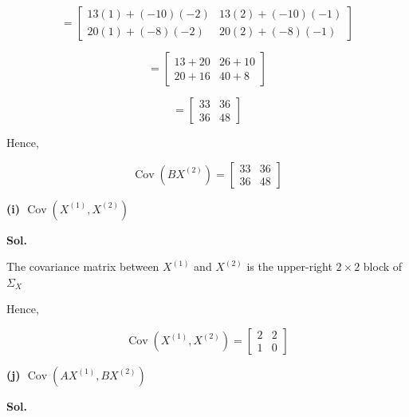 \documentclass[12pt]{article}
\begin{document}
\[
=
\begin{bmatrix}
13(1)+(-10)(-2) &
13(2)+(-10)(-1)
\\
20(1)+(-8)(-2) &
20(2)+(-8)(-1)
\end{bmatrix}
\]

\[
=
\begin{bmatrix}
13+20 & 26+10\\
20+16 & 40+8
\end{bmatrix}
\]

\[
=
\begin{bmatrix}
33 & 36\\
36 & 48
\end{bmatrix}
\]

\noindent
Hence,

\[
\boxed{
\operatorname{Cov}(BX^{(2)})
=
\begin{bmatrix}
33 & 36\\
36 & 48
\end{bmatrix}
}
\]

\vspace{1cm}

\noindent
\textbf{(i) \(\operatorname{Cov}(X^{(1)},X^{(2)})\)}

\vspace{0.5cm}

\noindent
\textbf{Sol.}

\vspace{0.3cm}

\noindent
The covariance matrix between \(X^{(1)}\) and \(X^{(2)}\) is the upper-right \(2\times2\) block of \(\Sigma_X\)

\vspace{0.3cm}

\noindent
Hence,

\vspace{0.3cm}

\[
\boxed{
\operatorname{Cov}(X^{(1)},X^{(2)})
=
\begin{bmatrix}
2 & 2\\
1 & 0
\end{bmatrix}
}
\]

\vspace{1cm}

\noindent
\textbf{(j) \(\operatorname{Cov}(AX^{(1)},BX^{(2)})\)}

\vspace{0.5cm}

\noindent
\textbf{Sol.}

\vspace{0.3cm}
\end{document}
